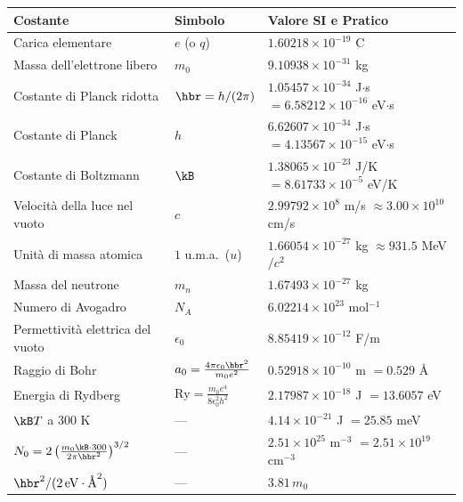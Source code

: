 \vspace{0.3cm}
\begin{table}[htpb]
\centering
\renewcommand{\arraystretch}{1.2}
{\small
\begin{tabular}{l l l}
\toprule
\textbf{Costante} & \textbf{Simbolo} & \textbf{Valore SI e Pratico} \\
\midrule
Carica elementare & $e$ (o $q$) & $1.60218\times10^{-19}$ C \\
Massa dell'elettrone libero & $m_0$ & $9.10938\times10^{-31}$ kg \\
Costante di Planck ridotta & $\hbr = h/(2\pi)$ & $1.05457\times10^{-34}$ J$\cdot$s $= 6.58212\times10^{-16}$ eV$\cdot$s \\
Costante di Planck & $h$ & $6.62607\times10^{-34}$ J$\cdot$s $= 4.13567\times10^{-15}$ eV$\cdot$s \\
Costante di Boltzmann & $\kB$ & $1.38065\times10^{-23}$ J/K $= 8.61733\times10^{-5}$ eV/K \\
Velocità della luce nel vuoto & $c$ & $2.99792\times10^{8}$ m/s $\approx 3.00\times10^{10}$ cm/s \\
Unità di massa atomica & $1$ u.m.a.\ ($u$) & $1.66054\times10^{-27}$ kg $\approx 931.5$ MeV$/c^2$ \\
Massa del neutrone & $m_n$ & $1.67493\times10^{-27}$ kg \\
Numero di Avogadro & $N_A$ & $6.02214\times10^{23}$ mol$^{-1}$ \\
Permettività elettrica del vuoto & $\epsilon_0$ & $8.85419\times10^{-12}$ F/m \\
Raggio di Bohr & $a_0 = \frac{4\pi\epsilon_0\hbr^2}{m_0e^2}$ & $0.52918\times10^{-10}$ m $= 0.529$ \AA \\
Energia di Rydberg & $\text{Ry} = \frac{m_0e^4}{8\epsilon_0^2h^2}$ & $2.17987\times10^{-18}$ J $= 13.6057$ eV \\
$\kB T$ a 300 K & --- & $4.14\times10^{-21}$ J $= 25.85$ meV \\
$N_0 = 2\left(\frac{m_0\kB\cdot300}{2\pi\hbr^2}\right)^{3/2}$ & --- & $2.51\times10^{25}$ m$^{-3}$ $= 2.51\times10^{19}$ cm$^{-3}$ \\
$\hbr^2/(2\,\text{eV}\cdot\text{\AA}^2)$ & --- & $3.81\,m_0$ \\
\bottomrule
\end{tabular}}
\end{table}

